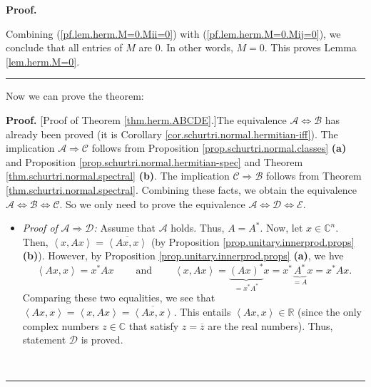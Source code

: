 \documentclass[numbers=enddot,12pt,final,onecolumn,notitlepage]{scrartcl}%
\numberwithin{exer}{subsection}
\theoremstyle{definition}
\newenvironment{proof}[1][Proof]{\noindent\textbf{#1.} }{\ \rule{0.5em}{0.5em}}
\begin{document}
\begin{proof}
\begin{itemize}
\end{itemize}

Combining (\ref{pf.lem.herm.M=0.Mii=0}) with (\ref{pf.lem.herm.M=0.Mij=0}), we
conclude that all entries of $M$ are $0$. In other words, $M=0$. This proves
Lemma \ref{lem.herm.M=0}.
\end{proof}

Now we can prove the theorem:

\begin{proof}
[Proof of Theorem \ref{thm.herm.ABCDE}.]The equivalence $\mathcal{A}%
\Longleftrightarrow\mathcal{B}$ has already been proved (it is Corollary
\ref{cor.schurtri.normal.hermitian-iff}). The implication $\mathcal{A}%
\Longrightarrow\mathcal{C}$ follows from Proposition
\ref{prop.schurtri.normal.classes} \textbf{(a)} and Proposition
\ref{prop.schurtri.normal.hermitian-spec} and Theorem
\ref{thm.schurtri.normal.spectral} \textbf{(b)}. The implication
$\mathcal{C}\Longrightarrow\mathcal{B}$ follows from Theorem
\ref{thm.schurtri.normal.spectral}. Combining these facts, we obtain the
equivalence $\mathcal{A}\Longleftrightarrow\mathcal{B}\Longleftrightarrow
\mathcal{C}$. So we only need to prove the equivalence $\mathcal{A}%
\Longleftrightarrow\mathcal{D}\Longleftrightarrow\mathcal{E}$.

\begin{itemize}
\item \textit{Proof of }$\mathcal{A}\Longrightarrow\mathcal{D}$\textit{:}
Assume that $\mathcal{A}$ holds. Thus, $A=A^{\ast}$. Now, let $x\in
\mathbb{C}^{n}$. Then, $\left\langle x,Ax\right\rangle =\overline{\left\langle
Ax,x\right\rangle }$ (by Proposition \ref{prop.unitary.innerprod.props}
\textbf{(b)}). However, by Proposition \ref{prop.unitary.innerprod.props}
\textbf{(a)}, we hve%
\[
\left\langle Ax,x\right\rangle =x^{\ast}Ax\ \ \ \ \ \ \ \ \ \ \text{and}%
\ \ \ \ \ \ \ \ \ \ \left\langle x,Ax\right\rangle =\underbrace{\left(
Ax\right)  ^{\ast}}_{=x^{\ast}A^{\ast}}x=x^{\ast}\underbrace{A^{\ast}}%
_{=A}x=x^{\ast}Ax.
\]
Comparing these two equalities, we see that $\left\langle Ax,x\right\rangle
=\left\langle x,Ax\right\rangle =\overline{\left\langle Ax,x\right\rangle }$.
This entails $\left\langle Ax,x\right\rangle \in\mathbb{R}$ (since the only
complex numbers $z\in\mathbb{C}$ that satisfy $z=\overline{z}$ are the real
numbers). Thus, statement $\mathcal{D}$ is proved.


\end{itemize}
\end{proof}
\end{document}
